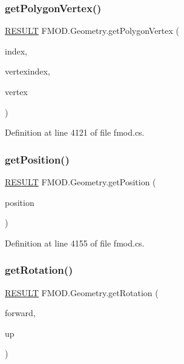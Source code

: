 \subsubsection{\texorpdfstring{get\+Polygon\+Vertex()}{getPolygonVertex()}}
{\footnotesize\ttfamily \hyperlink{namespace_f_m_o_d_a305d1176ef3f8c8815861a60407ac33d}{R\+E\+S\+U\+LT} F\+M\+O\+D.\+Geometry.\+get\+Polygon\+Vertex (\begin{DoxyParamCaption}\item[{int}]{index,  }\item[{int}]{vertexindex,  }\item[{out \hyperlink{struct_f_m_o_d_1_1_v_e_c_t_o_r}{V\+E\+C\+T\+OR}}]{vertex }\end{DoxyParamCaption})}



Definition at line 4121 of file fmod.\+cs.

\mbox{\label{class_f_m_o_d_1_1_geometry_abc470dd5be42ffb0007b2046f1195d2b}} 
\subsubsection{\texorpdfstring{get\+Position()}{getPosition()}}
{\footnotesize\ttfamily \hyperlink{namespace_f_m_o_d_a305d1176ef3f8c8815861a60407ac33d}{R\+E\+S\+U\+LT} F\+M\+O\+D.\+Geometry.\+get\+Position (\begin{DoxyParamCaption}\item[{out \hyperlink{struct_f_m_o_d_1_1_v_e_c_t_o_r}{V\+E\+C\+T\+OR}}]{position }\end{DoxyParamCaption})}



Definition at line 4155 of file fmod.\+cs.

\mbox{\label{class_f_m_o_d_1_1_geometry_a4404e35a5d036794d04a090be76d56df}} 
\subsubsection{\texorpdfstring{get\+Rotation()}{getRotation()}}
{\footnotesize\ttfamily \hyperlink{namespace_f_m_o_d_a305d1176ef3f8c8815861a60407ac33d}{R\+E\+S\+U\+LT} F\+M\+O\+D.\+Geometry.\+get\+Rotation (\begin{DoxyParamCaption}\item[{out \hyperlink{struct_f_m_o_d_1_1_v_e_c_t_o_r}{V\+E\+C\+T\+OR}}]{forward,  }\item[{out \hyperlink{struct_f_m_o_d_1_1_v_e_c_t_o_r}{V\+E\+C\+T\+OR}}]{up }\end{DoxyParamCaption})}



